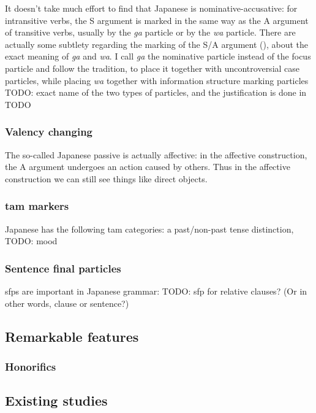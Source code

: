 \documentclass[UTF8, a4paper, oneside, scheme=plain]{ctexart}
\newcommand{\corpus}[1]{\emph{#1}}
\begin{document}
It doesn't take much effort to find that Japanese is nominative-accusative:
for intransitive verbs,
the S argument is marked in the same way as the A argument of transitive verbs,
usually by the \corpus{ga} particle or by the \corpus{wa} particle.
There are actually some subtlety regarding the marking of the S/A argument (),
about the exact meaning of \corpus{ga} and \corpus{wa}.
I call \corpus{ga} the nominative particle instead of the focus particle 
and follow the tradition, to place it together with uncontroversial case particles,
while placing \corpus{wa} together with information structure marking particles TODO: exact name of the two types of particles,
and the justification is done in TODO

\subsubsection{Valency changing}

The so-called Japanese passive is actually affective:
in the affective construction, the A argument undergoes an action caused by others. 
Thus in the affective construction we can still see things like direct objects.

\subsubsection{\Acl{tam} markers}

Japanese has the following \ac{tam} categories:
a past/non-past tense distinction,
TODO: mood

\subsubsection{Sentence final particles}

\acs{sfp}s are important in Japanese grammar:
TODO: sfp for relative clauses? (Or in other words, clause or sentence?)

\subsection{Remarkable features}

\subsubsection{Honorifics}

\subsection{Existing studies}
\end{document}
